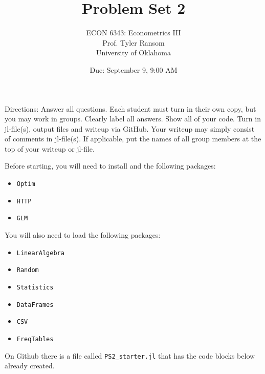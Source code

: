 \documentclass[12pt,english]{article}
\begin{document}
\title{Problem Set 2}
\author{ECON 6343: Econometrics III\\
Prof. Tyler Ransom\\
University of Oklahoma}
\date{Due: September 9, 9:00 AM}

\maketitle
Directions: Answer all questions. Each student must turn in their own copy, but you may work in groups. Clearly label all answers. Show all of your code. Turn in jl-file(s), output files and writeup via GitHub. Your writeup may simply consist of comments in jl-file(s). If applicable, put the names of all group members at the top of your writeup or jl-file.


Before starting, you will need to install and the following packages:
\begin{itemize}
    \item[~] \texttt{Optim} 
    \item[~] \texttt{HTTP} 
    \item[~] \texttt{GLM} 
\end{itemize}

You will also need to load the following packages:
\begin{itemize}
    \item[~] \texttt{LinearAlgebra} 
    \item[~] \texttt{Random} 
    \item[~] \texttt{Statistics} 
    \item[~] \texttt{DataFrames} 
    \item[~] \texttt{CSV} 
    \item[~] \texttt{FreqTables}
\end{itemize}

On Github there is a file called \texttt{PS2\_starter.jl} that has the code blocks below already created.
\end{document}
